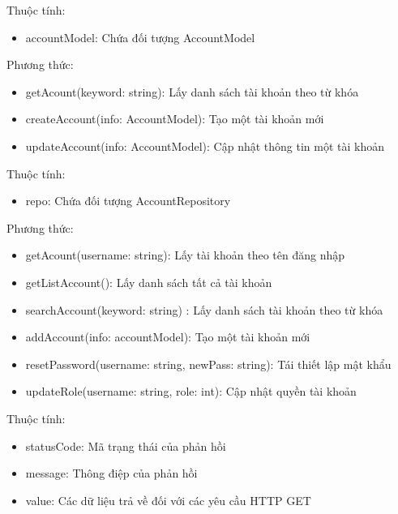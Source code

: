 Thuộc tính:
\begin{itemize}
	\item accountModel: Chứa đối tượng AccountModel
\end{itemize}
Phương thức:
\begin{itemize}
	\item getAcount(keyword: string): Lấy danh sách tài khoản theo từ khóa
	\item createAccount(info: AccountModel): Tạo một tài khoản mới
	\item updateAccount(info: AccountModel): Cập nhật thông tin một tài khoản
\end{itemize}

Thuộc tính:
\begin{itemize}
	\item repo: Chứa đối tượng AccountRepository
\end{itemize}
Phương thức:
\begin{itemize}
	\item getAcount(username: string): Lấy tài khoản theo tên đăng nhập
	\item getListAccount(): Lấy danh sách tất cả tài khoản
	\item searchAccount(keyword: string) : Lấy danh sách tài khoản theo từ khóa
	\item addAccount(info: accountModel): Tạo một tài khoản mới
	\item resetPassword(username: string, newPass: string): Tái thiết lập mật khẩu	
	\item updateRole(username: string, role: int): Cập nhật quyền tài khoản
\end{itemize}


Thuộc tính:
\begin{itemize}
	\item statusCode: Mã trạng thái của phản hồi
	\item message: Thông điệp của phản hồi
	\item value: Các dữ liệu trả về đối với các yêu cầu HTTP GET
\end{itemize}




